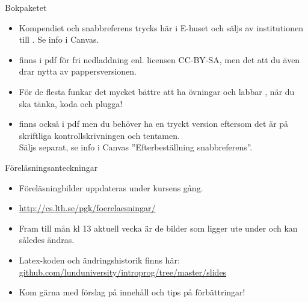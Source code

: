 \else


\begin{SlideExtra}{Bokpaketet}\SlideFontSmall
{}
\begin{itemize}
\item Kompendiet och snabbreferens trycks här i E-huset och säljs av institutionen till . Se info i Canvas.

\item {} finns i pdf för fri nedladdning enl. licensen CC-BY-SA, men det  att du även drar nytta av pappersversionen.

\item För de flesta funkar det mycket bättre att ha övningar och labbar  , när du ska tänka, koda och plugga!

\item {} finns också i pdf men du behöver ha en tryckt version eftersom det är  på skriftliga kontrollskrivningen och tentamen. \\ Säljs separat, se info i Canvas ''Efterbeställning snabbreferens''.

\end{itemize}
\end{SlideExtra}

\begin{SlideExtra}{Föreläsningsanteckningar}
\begin{itemize}
\item Föreläsningbilder uppdateras under kursens gång.
\item \url{http://cs.lth.se/pgk/foerelaesningar/}
\item Fram till mån kl 13 aktuell vecka är de bilder som ligger ute under  och kan således ändras.
\item Latex-koden och ändringshistorik finns här: \\
\href{https://github.com/lunduniversity/introprog/tree/master/slides}{github.com/lunduniversity/introprog/tree/master/slides}
\item Kom gärna med förslag på innehåll och tips på förbättringar!
\end{itemize}
\end{SlideExtra}
\fi

